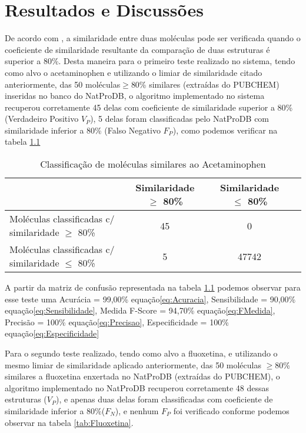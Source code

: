 \chapter{Resultados e Discussões}
\label{chap:resul}
 
 De acordo com , a similaridade entre duas moléculas pode ser verificada quando o coeficiente de similaridade resultante da comparação de duas estruturas é superior a 80\%. Desta maneira para o primeiro teste realizado no sistema, tendo como alvo o acetaminophen e utilizando o limiar de similaridade citado anteriormente, das 50 moléculas$\geq $80\% similares (extraídas do PUBCHEM) inseridas no banco do NatProDB, o algoritmo implementado no sistema recuperou corretamente 45 delas com coeficiente de similaridade superior a 80\% (Verdadeiro Positivo $V_P$), 5 delas foram classificadas pelo NatProDB com similaridade inferior a 80\% (Falso Negativo $F_P$), como podemos verificar na tabela \ref{tab:Acetaminophen} 
 
 \begin{table}[!htb]
	\centering
	\footnotesize
	\caption[Classificação de moléculas similares ao Acetaminophen]{Classificação de moléculas similares ao Acetaminophen}
	\label{tab:Acetaminophen}	
	\begin{tabular}{p{4cm}ccc}
		\hline \SPACE
		\textbf{}&\textbf{Similaridade $\geq $ 80\%} & \textbf{Similaridade $\leq $ 80\%} \\ \hline \SPACE
	Moléculas classificadas c/ similaridade $\geq $ 80\%  &	45 & 0 \\ \hline \SPACE
	Moléculas classificadas c/ similaridade $\leq $ 80\%  & 5 & 47742\\ \hline 
	\end{tabular}
\end{table}
A partir da matriz de confusão  representada na tabela \ref{tab:Acetaminophen} podemos observar para esse teste uma Acurácia = 99,00\% equação\eqref{eq:Acuracia}, Sensibilidade = 90,00\% equação\ref{eq:Sensibilidade}, Medida F-Score = 94,70\% equação\eqref{eq:FMedida}, Precisão = 100\% equação\eqref{eq:Precisao}, Especificidade = 100\% equação\eqref{eq:Especificidade}

Para o segundo teste realizado, tendo como alvo a fluoxetina, e utilizando o mesmo limiar de similaridade aplicado anteriormente, das 50 moléculas $\geq $80\% similares a fluoxetina enxertada no NatProDB (extraídas do PUBCHEM), o algoritmo implementado no NatProDB recuperou corretamente 48 dessas estruturas ($V_P$), e apenas duas delas foram classificadas com coeficiente de similaridade inferior a 80\%($F_N$), e nenhum $F_P$ foi verificado conforme podemos observar na tabela \ref{tab:Fluoxetina}. 


